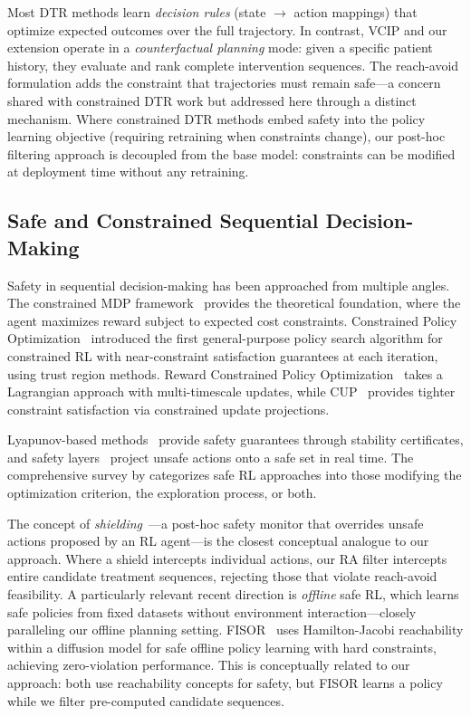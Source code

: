 \documentclass{article}
\begin{document}
Most DTR methods learn \emph{decision rules} (state $\to$ action mappings) that optimize expected outcomes over the full trajectory. In contrast, VCIP and our extension operate in a \emph{counterfactual planning} mode: given a specific patient history, they evaluate and rank complete intervention sequences. The reach-avoid formulation adds the constraint that trajectories must remain safe---a concern shared with constrained DTR work but addressed here through a distinct mechanism. Where constrained DTR methods embed safety into the policy learning objective (requiring retraining when constraints change), our post-hoc filtering approach is decoupled from the base model: constraints can be modified at deployment time without any retraining.

\subsection{Safe and Constrained Sequential Decision-Making}

Safety in sequential decision-making has been approached from multiple angles. The constrained MDP framework~\citep{altman1999constrained} provides the theoretical foundation, where the agent maximizes reward subject to expected cost constraints. Constrained Policy Optimization~\citep[CPO;][]{achiam2017constrained} introduced the first general-purpose policy search algorithm for constrained RL with near-constraint satisfaction guarantees at each iteration, using trust region methods. Reward Constrained Policy Optimization~\citep[RCPO;][]{tessler2019rcpo} takes a Lagrangian approach with multi-timescale updates, while CUP~\citep{yang2022cup} provides tighter constraint satisfaction via constrained update projections.

Lyapunov-based methods~\citep{chow2018safe} provide safety guarantees through stability certificates, and safety layers~\citep{dalal2018safe} project unsafe actions onto a safe set in real time. The comprehensive survey by \citet{garcia2015comprehensive} categorizes safe RL approaches into those modifying the optimization criterion, the exploration process, or both.

The concept of \emph{shielding}~\citep{alshiekh2018shielding}---a post-hoc safety monitor that overrides unsafe actions proposed by an RL agent---is the closest conceptual analogue to our approach. Where a shield intercepts individual actions, our RA filter intercepts entire candidate treatment sequences, rejecting those that violate reach-avoid feasibility. A particularly relevant recent direction is \emph{offline} safe RL, which learns safe policies from fixed datasets without environment interaction---closely paralleling our offline planning setting. FISOR~\citep{zheng2024fisor} uses Hamilton-Jacobi reachability within a diffusion model for safe offline policy learning with hard constraints, achieving zero-violation performance. This is conceptually related to our approach: both use reachability concepts for safety, but FISOR learns a policy while we filter pre-computed candidate sequences.
\end{document}
